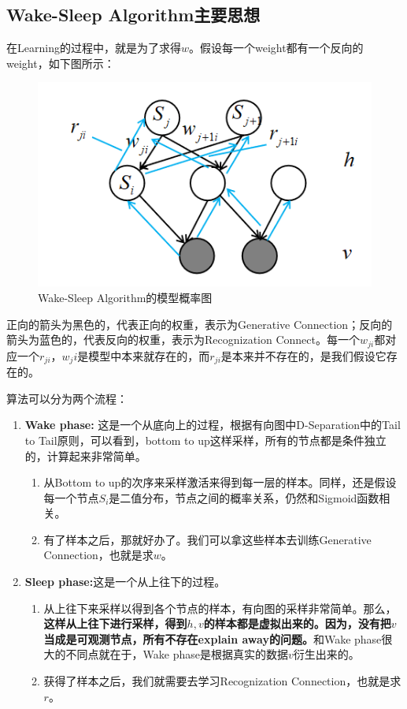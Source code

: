 \documentclass[a4paper]{article}
\begin{document}
\subsection{Wake-Sleep Algorithm主要思想}
在Learning的过程中，就是为了求得$w$。假设每一个weight都有一个反向的weight，如下图所示：
\begin{figure}[H]
    \centering
    \includegraphics[width=.55\textwidth]{微信图片_20200321171927.png}
    \caption{Wake-Sleep Algorithm的模型概率图}
    \label{fig:my_label_1}
\end{figure}
正向的箭头为黑色的，代表正向的权重，表示为Generative Connection；反向的箭头为蓝色的，代表反向的权重，表示为Recognization Connect。每一个$w_{ji}$都对应一个$r_{ji}$，$w_ji$是模型中本来就存在的，而$r_{ji}$是本来并不存在的，是我们假设它存在的。

算法可以分为两个流程：
\begin{enumerate}
    \item \textbf{Wake phase: }这是一个从底向上的过程，根据有向图中D-Separation中的Tail to Tail原则，可以看到，bottom to up这样采样，所有的节点都是条件独立的，计算起来非常简单。
    \begin{enumerate}
        \item 从Bottom to up的次序来采样激活来得到每一层的样本。同样，还是假设每一个节点$S_i$是二值分布，节点之间的概率关系，仍然和Sigmoid函数相关。
        \item 有了样本之后，那就好办了。我们可以拿这些样本去训练Generative Connection，也就是求$w$。
    \end{enumerate}
    \item \textbf{Sleep phase:}这是一个从上往下的过程。
    \begin{enumerate}
        \item 从上往下来采样以得到各个节点的样本，有向图的采样非常简单。那么，\textbf{这样从上往下进行采样，得到$h,v$的样本都是虚拟出来的。因为，没有把$v$当成是可观测节点，所有不存在explain away的问题。}和Wake phase很大的不同点就在于，Wake phase是根据真实的数据$v$衍生出来的。
        \item 获得了样本之后，我们就需要去学习Recognization Connection，也就是求$r$。
    \end{enumerate}
\end{enumerate}
\end{document}
